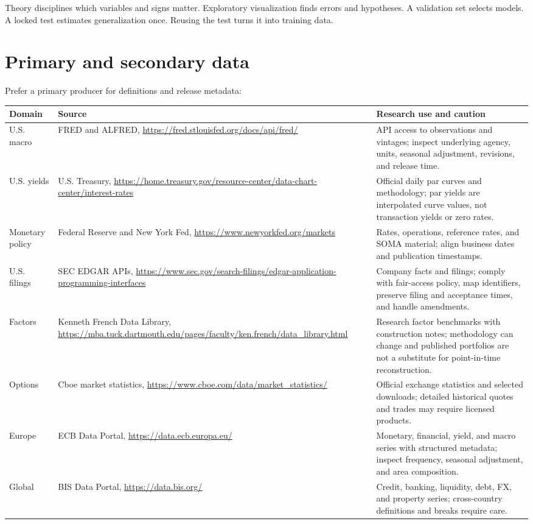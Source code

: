Theory disciplines which variables and signs matter. Exploratory visualization finds
errors and hypotheses. A validation set selects models. A locked test estimates
generalization once. Reusing the test turns it into training data.

\section{Primary and secondary data}

Prefer a primary producer for definitions and release metadata:

\begin{longtable}{p{}p{}p{}}
\toprule
Domain & Source & Research use and caution\\
\midrule
U.S. macro & FRED and ALFRED, \url{https://fred.stlouisfed.org/docs/api/fred/} &
API access to observations and vintages; inspect underlying agency, units, seasonal
adjustment, revisions, and release time.\\
U.S. yields & U.S. Treasury, \url{https://home.treasury.gov/resource-center/data-chart-center/interest-rates} &
Official daily par curves and methodology; par yields are interpolated curve values,
not transaction yields or zero rates.\\
Monetary policy & Federal Reserve and New York Fed,
\url{https://www.newyorkfed.org/markets} &
Rates, operations, reference rates, and SOMA material; align business dates and
publication timestamps.\\
U.S. filings & SEC EDGAR APIs, \url{https://www.sec.gov/search-filings/edgar-application-programming-interfaces} &
Company facts and filings; comply with fair-access policy, map identifiers, preserve
filing and acceptance times, and handle amendments.\\
Factors & Kenneth French Data Library,
\url{https://mba.tuck.dartmouth.edu/pages/faculty/ken.french/data_library.html} &
Research factor benchmarks with construction notes; methodology can change and
published portfolios are not a substitute for point-in-time reconstruction.\\
Options & Cboe market statistics,
\url{https://www.cboe.com/data/market_statistics/} &
Official exchange statistics and selected downloads; detailed historical quotes and
trades may require licensed products.\\
Europe & ECB Data Portal, \url{https://data.ecb.europa.eu/} &
Monetary, financial, yield, and macro series with structured metadata; inspect
frequency, seasonal adjustment, and area composition.\\
Global & BIS Data Portal, \url{https://data.bis.org/} &
Credit, banking, liquidity, debt, FX, and property series; cross-country definitions
and breaks require care.\\
\bottomrule
\end{longtable}

